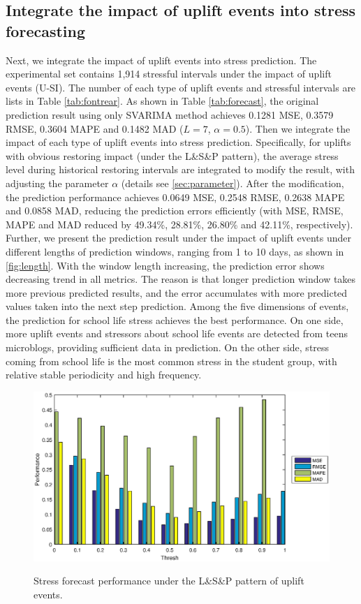 \subsection{Integrate the impact of uplift events into stress forecasting}
Next, we integrate the impact of uplift events into stress prediction.
The experimental set contains 1,914 stressful intervals under the impact of uplift events (U-SI).
The number of each type of uplift events and stressful intervals are lists in Table \ref{tab:fontrear}.
As shown in Table \ref{tab:forecast},
the original prediction result using only SVARIMA method
achieves 0.1281 MSE, 0.3579 RMSE, 0.3604 MAPE and 0.1482 MAD ($L = 7$, $\alpha = 0.5$).
Then we integrate the impact of each type of uplift events into stress prediction.
Specifically, for uplifts with obvious restoring impact (under the L\&S\&P pattern),
the average stress level during historical restoring intervals are integrated to modify the result,
with adjusting the parameter $\alpha$ (details see \ref{sec:parameter}).
After the modification,
the prediction performance achieves 0.0649 MSE,	0.2548 RMSE, 0.2638 MAPE and 0.0858 MAD,
reducing the prediction errors efficiently (with MSE, RMSE, MAPE and MAD reduced by 49.34\%, 28.81\%, 26.80\% and 42.11\%, respectively). %
Further,
we present the prediction result under the impact of uplift events under different lengths of prediction windows,
ranging from 1 to 10 days, as shown in \ref{fig:length}.
With the window length increasing,
the prediction error shows decreasing trend in all metrics.
The reason is that longer prediction window takes more previous predicted results,
and the error accumulates with more predicted values taken into the next step prediction.
Among the five dimensions of events,
the prediction for school life stress achieves the best performance.
On one side,
more uplift events and stressors about school life events are detected from teens microblogs,
providing sufficient data in prediction.
On the other side,
stress coming from school life is the most common stress in the student group,
with relative stable periodicity and high frequency.

\begin{figure}
\centering
\caption{Stress forecast performance under the L\&S\&P pattern of uplift events.}
\includegraphics[width=\linewidth]{figs/threshNew.eps}
\label{fig:thresh}
\end{figure}

